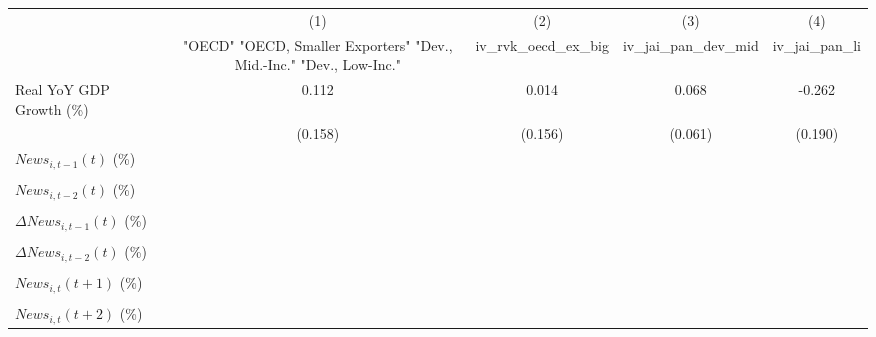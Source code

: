 {
\def\sym#1{\ifmmode^{#1}\else\(^{#1}\)\fi}
\begin{tabular}{l*{4}{c}}
\toprule
                    &\multicolumn{1}{c}{(1)}&\multicolumn{1}{c}{(2)}&\multicolumn{1}{c}{(3)}&\multicolumn{1}{c}{(4)}\\
                    &\multicolumn{1}{c}{ "OECD" "OECD, Smaller Exporters" "Dev., Mid.-Inc." "Dev., Low-Inc."}&\multicolumn{1}{c}{iv_rvk_oecd_ex_big}&\multicolumn{1}{c}{iv_jai_pan_dev_mid}&\multicolumn{1}{c}{iv_jai_pan_li}\\
\midrule
Real YoY GDP Growth (\%)&       0.112         &       0.014         &       0.068         &      -0.262         \\
                    &     (0.158)         &     (0.156)         &     (0.061)         &     (0.190)         \\
\addlinespace
$ News_{i,t-1}(t)$ (\%)&                     &                     &                     &                     \\
                    &                     &                     &                     &                     \\
\addlinespace
$ News_{i,t-2}(t)$ (\%)&                     &                     &                     &                     \\
                    &                     &                     &                     &                     \\
\addlinespace
$ \Delta News_{i,t-1}(t)$ (\%)&                     &                     &                     &                     \\
                    &                     &                     &                     &                     \\
\addlinespace
$ \Delta News_{i,t-2}(t)$ (\%)&                     &                     &                     &                     \\
                    &                     &                     &                     &                     \\
\addlinespace
$ News_{i,t}(t+1)$ (\%)&                     &                     &                     &                     \\
                    &                     &                     &                     &                     \\
\addlinespace
$ News_{i,t}(t+2)$ (\%)&                     &                     &                     &                     \\

\end{tabular}}
